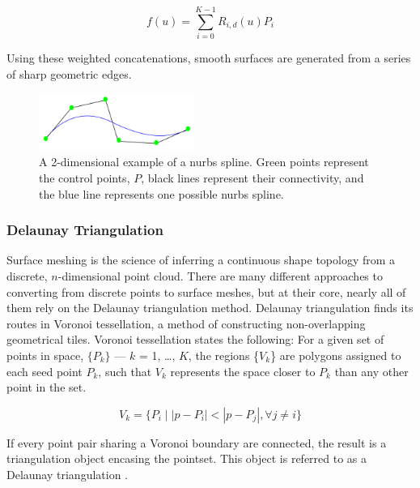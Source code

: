 \documentclass[12pt]{drexelthesis}
\let\Oldsubsubsection\subsubsection
\renewcommand{\subsubsection}{\FloatBarrier\Oldsubsubsection}
\begin{document}
 \begin{equation}
 	f(u) = \sum_{i=0}^{K-1} R_{i,d}(u) P_{i}
\end{equation}

Using these weighted concatenations, smooth surfaces are generated from a series of sharp geometric edges.


\begin{figure}[!ht]
	\centering
		\includegraphics[width=2in]{cadTypes/nurbs.png}
	\caption[Example of a 2-dimensional nurbs spline.]{\centering A 2-dimensional example of a nurbs spline. Green points represent the control points, $P$, black lines represent their connectivity, and the blue line represents one possible nurbs spline.}
\end{figure}


\subsubsection{Delaunay Triangulation}
\label{subsubsec:delaunay}
Surface meshing is the science of inferring a continuous shape topology from a discrete, $n$-dimensional point cloud. There are many different approaches to converting from discrete points to surface meshes, but at their core, nearly all of them rely on the Delaunay triangulation method.
Delaunay triangulation finds its routes in Voronoi tessellation, a method of constructing non-overlapping geometrical tiles. Voronoi tessellation states the following:
For a given set of points in space, $\{P_{k}\}$ --- $k$ = 1, \ldots, $K$, the regions \{$V_{k}$\} are polygons assigned to each seed point $P_{k}$, such that $V_{k}$ represents the space closer to $P_{k}$ than any other point in the set.

\begin{equation}
	V_{k} = \{P_{i} \mid |p - P_{i}| < |p - P_{j}|, \forall j \neq i \}
\end{equation}

If every point pair sharing a Voronoi boundary are connected, the result is a triangulation object encasing the pointset. This object is referred to as a Delaunay triangulation \cite{RN65}.
\end{document}
